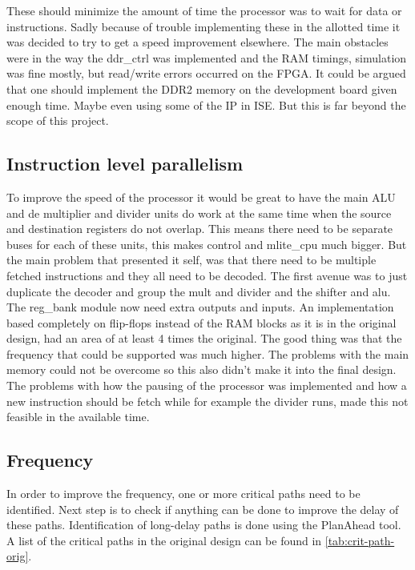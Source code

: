 \documentclass[final]{article}
\begin{document}
These should minimize the amount of time the processor was to wait for data or instructions.
Sadly because of trouble implementing these in the allotted time it was decided to try to get a speed improvement elsewhere.
The main obstacles were in the way the ddr\_ctrl was implemented and the RAM timings, simulation was fine mostly, but read/write errors occurred on the FPGA.
It could be argued that one should implement the DDR2 memory on the development board given enough time.
Maybe even using some of the IP in ISE.
But this is far beyond the scope of this project.

\subsection{Instruction level parallelism}
To improve the speed of the processor it would be great to have the main ALU and de multiplier and divider units do work at the same time when the source and destination registers do not overlap.
This means there need to be separate buses for each of these units, this makes control and mlite\_cpu much bigger.
But the main problem that presented it self, was that there need to be multiple fetched instructions and they all need to be decoded.
The first avenue was to just duplicate the decoder and group the mult and divider and the shifter and alu.
The reg\_bank module now need extra outputs and inputs.
An implementation based completely on flip-flops instead of the RAM blocks as it is in the original design, had an area of at least 4 times the original.
The good thing was that the frequency that could be supported was much higher.
The problems with the main memory could not be overcome so this also didn't make it into the final design.
The problems with how the pausing of the processor was implemented and how a new instruction should be fetch while for example the divider runs, made this not feasible in the available time.

\subsection{Frequency}
In order to improve the frequency, one or more critical paths need to be identified.
Next step is to check if anything can be done to improve the delay of these paths.
Identification of long-delay paths is done using the PlanAhead tool.
A list of the critical paths in the original design can be found in \cref{tab:crit-path-orig}.
\end{document}
